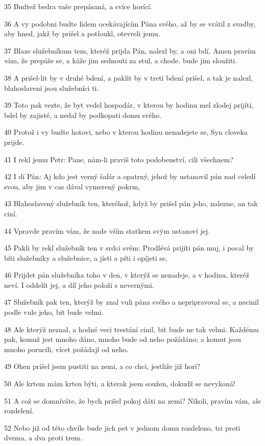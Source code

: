 \par 35 Budtež bedra vaše prepásaná, a svíce horící.
\par 36 A vy podobni budte lidem ocekávajícím Pána svého, až by se vrátil z svadby, aby hned, jakž by prišel a potloukl, otevreli jemu.
\par 37 Blaze služebníkum tem, kteréž prijda Pán, nalezl by, a oni bdí. Amen pravím vám, že prepáše se, a káže jim sednouti za stul, a chode, bude jim sloužiti.
\par 38 A prišel-lit by v druhé bdení, a paklit by v tretí bdení prišel, a tak je nalezl, blahoslavení jsou služebníci ti.
\par 39 Toto pak vezte, že byt vedel hospodár, v kterou by hodinu mel zlodej prijíti, bdel by zajisté, a nedal by podkopati domu svého.
\par 40 Protož i vy budte hotovi, nebo v kterou hodinu nenadejete se, Syn cloveka prijde.
\par 41 I rekl jemu Petr: Pane, nám-li pravíš toto podobenství, cili všechnem?
\par 42 I dí Pán: Aj kdo jest verný šafár a opatrný, jehož by ustanovil pán nad celedí svou, aby jim v cas dával vymerený pokrm,
\par 43 Blahoslavený služebník ten, kteréhož, když by prišel pán jeho, nalezne, an tak ciní.
\par 44 Vpravde pravím vám, že nade vším statkem svým ustanoví jej.
\par 45 Pakli by rekl služebník ten v srdci svém: Prodlévá prijíti pán muj, i pocal by bíti služebníky a služebnice, a jísti a píti i opíjeti se,
\par 46 Prijdet pán služebníka toho v den, v kterýž se nenadeje, a v hodinu, kteréž neví. I oddelít jej, a díl jeho položí s nevernými.
\par 47 Služebník pak ten, kterýž by znal vuli pána svého a nepripravoval se, a necinil podle vule jeho, bit bude velmi.
\par 48 Ale kterýž neznal, a hodné veci trestání cinil, bit bude ne tak velmi. Každému pak, komuž jest mnoho dáno, mnoho bude od neho požádáno; a komut jsou mnoho porucili, vícet požádají od neho.
\par 49 Ohen prišel jsem pustiti na zemi, a co chci, jestliže již horí?
\par 50 Ale krtem mám krten býti, a kterak jsem soužen, dokudž se nevykoná!
\par 51 A což se domníváte, že bych prišel pokoj dáti na zemi? Nikoli, pravím vám, ale rozdelení.
\par 52 Nebo již od této chvíle bude jich pet v jednom domu rozdeleno, tri proti dvema, a dva proti trem.
